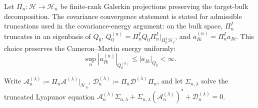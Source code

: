 \documentclass[preprint,12pt]{elsarticle}
\theoremstyle{plain}
\theoremstyle{definition}
\theoremstyle{remark}
\begin{document}
    Let $\Pi_n: \mathcal{H} \to \mathcal{H}_n$ be finite-rank Galerkin projections preserving the target-bulk decomposition.  The covariance convergence statement is stated for admissible truncations used in the covariance-energy argument: on the bulk space, $\Pi_n^I$ truncates in an eigenbasis of $Q_0$, $Q_0^{(n)}=\Pi_n^I Q_0\Pi_n^I|_{\Pi_n^I\mathcal{H}_I}$, and $a_{Ik}^{(n)}=\Pi_n^I a_{Ik}$.  This choice preserves the Cameron--Martin energy uniformly:
    \begin{equation}
        \sup_n |a_{Ik}^{(n)}|_{Q_0^{(n)}}\le |a_{Ik}|_{Q_0}<\infty.
    \end{equation}

    Write $\mathcal{A}_n^{(\lambda)} \coloneqq \Pi_n \mathcal{A}^{(\lambda)}|_{\mathcal{H}_n}$, $\mathcal{D}_n^{(\lambda)} \coloneqq \Pi_n \mathcal{D}^{(\lambda)} \Pi_n$, and let $\Sigma_{n,\lambda}$ solve the truncated Lyapunov equation $\mathcal{A}_n^{(\lambda)} \Sigma_{n,\lambda} + \Sigma_{n,\lambda} (\mathcal{A}_n^{(\lambda)})^* + \mathcal{D}_n^{(\lambda)} = 0$.
\end{document}
